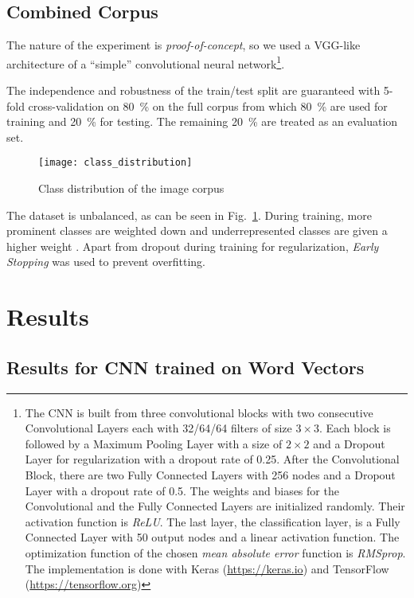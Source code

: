 \subsection{Combined Corpus}
The nature of the experiment is \emph{proof-of-concept}, so we used a VGG-like architecture of a \enquote{simple} convolutional neural network\footnote{The CNN is built from three convolutional blocks with two consecutive Convolutional Layers each with 32/64/64 filters of size $ 3 \times 3 $. Each block is followed by a Maximum Pooling Layer with a size of $ 2 \times 2 $ and a Dropout Layer for regularization with a dropout rate of \num{0.25}. After the Convolutional Block, there are two Fully Connected Layers with \num{256} nodes and a Dropout Layer with a dropout rate of \num{0.5}. The weights and biases for the Convolutional and the Fully Connected Layers are initialized randomly. Their activation function is \emph{ReLU}. The last layer, the classification layer, is a Fully Connected Layer with \num{50} output nodes and a linear activation function. The optimization function of the chosen \emph{mean absolute error} function is \emph{RMSprop}. The implementation is done with Keras (\url{https://keras.io}) and TensorFlow (\url{https://tensorflow.org})}.

The independence and robustness of the train/test split are guaranteed with 5-fold cross-validation on \SI{80}{\percent} on the full corpus from which \SI{80}{\percent} are used for training and \SI{20}{\percent} for testing. The remaining \SI{20}{\percent} are treated as an evaluation set.

\begin{figure}
    \centering
    \texttt{[image: class\_distribution]}
    \caption{Class distribution of the image corpus}
    \label{fig:class_distribution}
\end{figure}

The dataset is unbalanced, as can be seen in Fig.~\ref{fig:class_distribution}. During training, more prominent classes are weighted down and underrepresented classes are given a higher weight \parencite[p.~27]{johnson_SurveyDeepLearningClassImbalance_2019}. Apart from dropout during training for regularization, \emph{Early Stopping} was used to prevent overfitting.


\section{Results}

\subsection{Results for CNN trained on Word Vectors}


